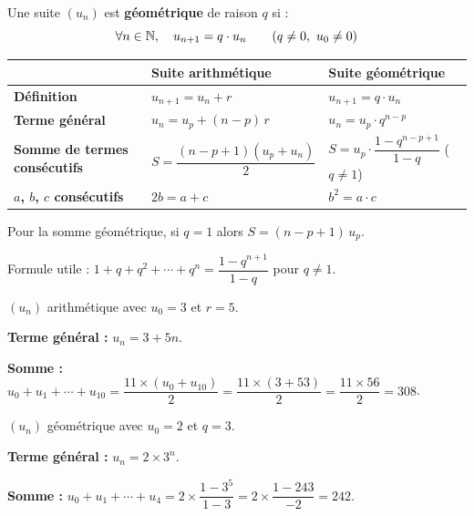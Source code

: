 \begin{definition}
  Une suite $(u_n)$ est \textbf{g\'{e}om\'{e}trique} de raison $q$ si :
  \[
    \forall n \in \mathbb{N}, \quad u_{n+1} = q \cdot u_n \qquad (q \neq 0,\ u_0 \neq 0)
  \]
\end{definition}
\newpage 
\begin{propriete}
  \bigskip
  \renewcommand{\arraystretch}{2.2}
  \begin{tabularx}{\linewidth}{|>{\bfseries}p{3.2cm}|>{\centering\arraybackslash}X|>{\centering\arraybackslash}X|}
    \hline
    \rowcolor{white}
      & \textbf{\color{navy}Suite arithm\'{e}tique}
      & \textbf{\color{forest}Suite g\'{e}om\'{e}trique} \\
    \hline\hline
    D\'{e}finition
      & $u_{n+1} = u_n + r$
      & $u_{n+1} = q \cdot u_n$ \\
    \hline
    Terme g\'{e}n\'{e}ral
      & $u_n = u_p + (n-p)\,r$
      & $u_n = u_p \cdot q^{n-p}$ \\
    \hline
    Somme de termes cons\'{e}cutifs
      & $S = \dfrac{(n-p+1)(u_p + u_n)}{2}$
      & $S = u_p \cdot \dfrac{1 - q^{n-p+1}}{1-q}$ \; ($q \neq 1$) \\
    \hline
    $a$, $b$, $c$ cons\'{e}cutifs
      & $2b = a + c$
      & $b^2 = a \cdot c$ \\
    \hline
  \end{tabularx}
\end{propriete}

\begin{remarque}
  Pour la somme g\'{e}om\'{e}trique, si $q = 1$ alors $S = (n-p+1)\,u_p$.

  \medskip
  Formule utile : $1 + q + q^2 + \cdots + q^n = \dfrac{1 - q^{n+1}}{1-q}$
  pour $q \neq 1$.
\end{remarque}

\begin{exemple}
  $(u_n)$ arithm\'{e}tique avec $u_0 = 3$ et $r = 5$.

  \medskip
  \textbf{Terme g\'{e}n\'{e}ral :} $u_n = 3 + 5n$.

  \medskip
  \textbf{Somme :} $u_0 + u_1 + \cdots + u_{10}
  = \dfrac{11 \times (u_0 + u_{10})}{2}
  = \dfrac{11 \times (3 + 53)}{2} = \dfrac{11 \times 56}{2} = 308$.
\end{exemple}

\begin{exemple}
  $(u_n)$ g\'{e}om\'{e}trique avec $u_0 = 2$ et $q = 3$.

  \medskip
  \textbf{Terme g\'{e}n\'{e}ral :} $u_n = 2 \times 3^n$.

  \medskip
  \textbf{Somme :} $u_0 + u_1 + \cdots + u_4
  = 2 \times \dfrac{1 - 3^5}{1 - 3}
  = 2 \times \dfrac{1 - 243}{-2} = 242$.
\end{exemple}
\newpage
